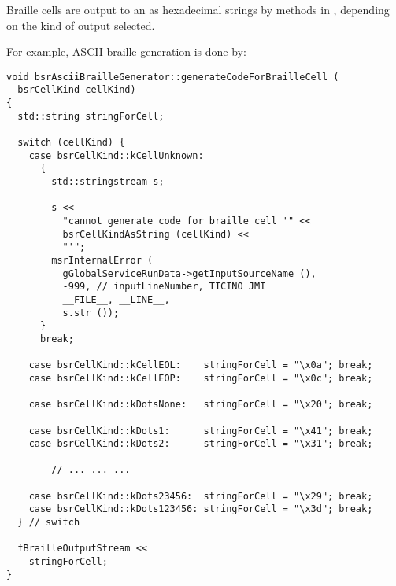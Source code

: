 Braille cells are output to an  as hexadecimal strings by  methods in , depending on the kind of output selected.

For example, ASCII braille generation is done by:
\begin{lstlisting}[language=CPlusPlus]
void bsrAsciiBrailleGenerator::generateCodeForBrailleCell (
  bsrCellKind cellKind)
{
  std::string stringForCell;

  switch (cellKind) {
    case bsrCellKind::kCellUnknown:
      {
        std::stringstream s;

        s <<
          "cannot generate code for braille cell '" <<
          bsrCellKindAsString (cellKind) <<
          "'";
        msrInternalError (
          gGlobalServiceRunData->getInputSourceName (),
          -999, // inputLineNumber, TICINO JMI
          __FILE__, __LINE__,
          s.str ());
      }
      break;

    case bsrCellKind::kCellEOL:    stringForCell = "\x0a"; break;
    case bsrCellKind::kCellEOP:    stringForCell = "\x0c"; break;

    case bsrCellKind::kDotsNone:   stringForCell = "\x20"; break;

    case bsrCellKind::kDots1:      stringForCell = "\x41"; break;
    case bsrCellKind::kDots2:      stringForCell = "\x31"; break;

		// ... ... ...

    case bsrCellKind::kDots23456:  stringForCell = "\x29"; break;
    case bsrCellKind::kDots123456: stringForCell = "\x3d"; break;
  } // switch

  fBrailleOutputStream <<
    stringForCell;
}
\end{lstlisting}

